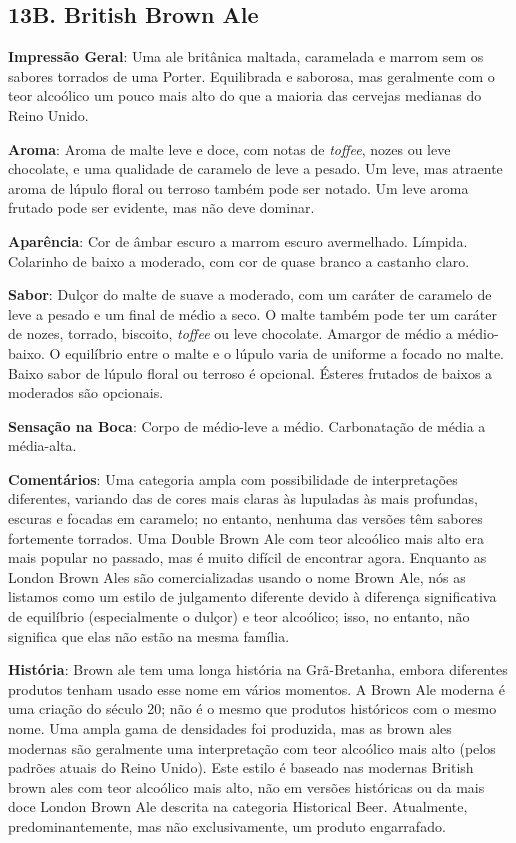 \subsection*{13B. British Brown Ale}
\textbf{Impressão Geral}: Uma ale britânica maltada, caramelada e marrom sem os sabores torrados de uma Porter. Equilibrada e saborosa, mas geralmente com o teor alcoólico um pouco mais alto do que a maioria das cervejas medianas do Reino Unido.

\textbf{Aroma}: Aroma de malte leve e doce, com notas de \textit{toffee}, nozes ou leve chocolate, e uma qualidade de caramelo de leve a pesado. Um leve, mas atraente aroma de lúpulo floral ou terroso também pode ser notado. Um leve aroma frutado pode ser evidente, mas não deve dominar.

\textbf{Aparência}: Cor de âmbar escuro a marrom escuro avermelhado. Límpida. Colarinho de baixo a moderado, com cor de quase branco a castanho claro.

\textbf{Sabor}: Dulçor do malte de suave a moderado, com um caráter de caramelo de leve a pesado e um final de médio a seco. O malte também pode ter um caráter de nozes, torrado, biscoito, \textit{toffee} ou leve chocolate. Amargor de médio a médio-baixo. O equilíbrio entre o malte e o lúpulo varia de uniforme a focado no malte. Baixo sabor de lúpulo floral ou terroso é opcional. Ésteres frutados de baixos a moderados são opcionais.

\textbf{Sensação na Boca}: Corpo de médio-leve a médio. Carbonatação de média a média-alta.

\textbf{Comentários}: Uma categoria ampla com possibilidade de interpretações diferentes, variando das de cores mais claras às lupuladas às mais profundas, escuras e focadas em caramelo; no entanto, nenhuma das versões têm sabores fortemente torrados. Uma Double Brown Ale com teor alcoólico mais alto era mais popular no passado, mas é muito difícil de encontrar agora. Enquanto as London Brown Ales são comercializadas usando o nome Brown Ale, nós as listamos como um estilo de julgamento diferente devido à diferença significativa de equilíbrio (especialmente o dulçor) e teor alcoólico; isso, no entanto, não significa que elas não estão na mesma família.

\textbf{História}: Brown ale tem uma longa história na Grã-Bretanha, embora diferentes produtos tenham usado esse nome em vários momentos. A Brown Ale moderna é uma criação do século 20; não é o mesmo que produtos históricos com o mesmo nome. Uma ampla gama de densidades foi produzida, mas as brown ales modernas são geralmente uma interpretação com teor alcoólico mais alto (pelos padrões atuais do Reino Unido). Este estilo é baseado nas modernas British brown ales com teor alcoólico mais alto, não em versões históricas ou da mais doce London Brown Ale descrita na categoria Historical Beer. Atualmente, predominantemente, mas não exclusivamente, um produto engarrafado.

